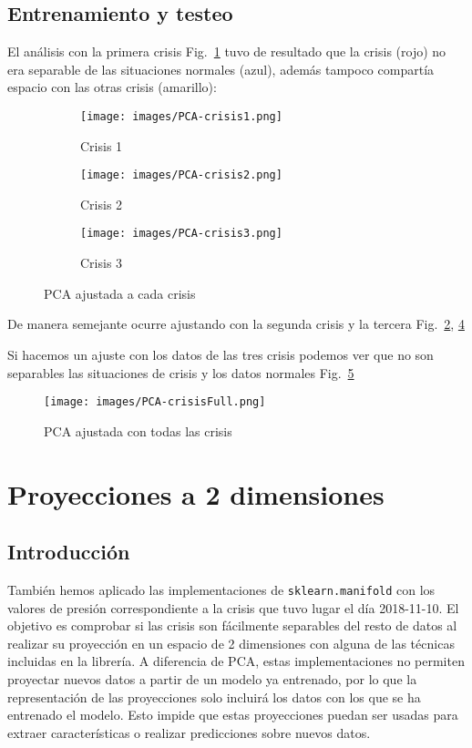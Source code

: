 \documentclass[a4paper,12pt,twoside,oldfontcommands]{memoir}
\begin{document}
	\section{Entrenamiento y testeo}
	El análisis con la primera crisis Fig.~\ref{fig:pca_crisis1} tuvo de resultado que la crisis (rojo) no era separable de las situaciones normales (azul), además tampoco compartía espacio con las otras crisis (amarillo):
	
	\begin{figure}
		\centering
		\begin{subfigure}[b]{0.45\textwidth}
			\texttt{[image: images/PCA-crisis1.png]}
			\caption{Crisis 1}
			\label{fig:pca_crisis1}
		\end{subfigure}
		\begin{subfigure}[b]{0.45\textwidth}
			\texttt{[image: images/PCA-crisis2.png]}
			\caption{Crisis 2}
			\label{fig:pca_crisis2}
		\end{subfigure}
		\begin{subfigure}[b]{0.45\textwidth}
			\texttt{[image: images/PCA-crisis3.png]}
			\caption{Crisis 3}
			\label{fig:pca_crisis3}
		\end{subfigure}
		\caption{PCA ajustada a cada crisis}
	\end{figure}
	
	De manera semejante ocurre ajustando con la segunda crisis y la tercera Fig.~\ref{fig:pca_crisis2}, \ref{fig:pca_crisis3}
	
	Si hacemos un ajuste con los datos de las tres crisis podemos ver que no son separables las situaciones de crisis y los datos normales Fig.~\ref{fig:pca_crisis_full}
	\begin{figure}
		\centering
		\texttt{[image: images/PCA-crisisFull.png]}
		\caption{PCA ajustada con todas las crisis}
		\label{fig:pca_crisis_full}
	\end{figure}
	\chapter{Proyecciones a 2 dimensiones}
	\section{Introducción}
	También hemos aplicado las implementaciones de \texttt{sklearn.manifold} con los valores de presión correspondiente a la crisis que tuvo lugar el día 2018-11-10. El objetivo es comprobar si las crisis son fácilmente separables del resto de datos al realizar su proyección en un espacio de 2 dimensiones con alguna de las técnicas incluidas en la librería. A diferencia de PCA, estas implementaciones no permiten proyectar nuevos datos a partir de un modelo ya entrenado, por lo que la representación de las proyecciones solo incluirá los datos con los que se ha entrenado el modelo. Esto impide que estas proyecciones puedan ser usadas para extraer características o realizar predicciones sobre nuevos datos.
	
\end{document}
